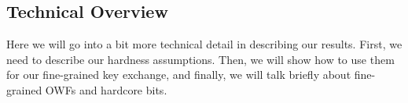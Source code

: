 %
%
%
%


\subsection{Technical Overview}
Here we will go into a bit more technical detail in describing our results. First, we need to describe our hardness assumptions. Then, we will show how to use them for our fine-grained key exchange, and finally, we will talk briefly about fine-grained OWFs and hardcore bits.

